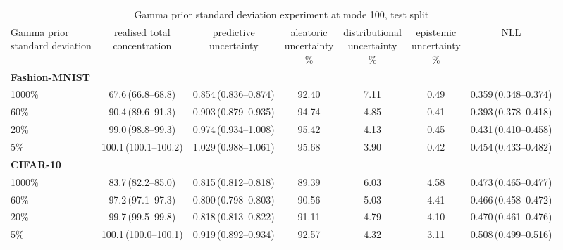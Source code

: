 \begin{tabular}{lcccccc}
\toprule
\multicolumn{7}{c}{Gamma prior standard deviation experiment at mode 100, test split} \\
\shortstack{Gamma prior\\standard deviation} & \shortstack{realised total\\concentration} & \shortstack{predictive\\uncertainty} & \shortstack{aleatoric\\uncertainty\\\%} & \shortstack{distributional\\uncertainty\\\%} & \shortstack{epistemic\\uncertainty\\\%} & NLL \\
\midrule
\multicolumn{7}{l}{\textbf{Fashion-MNIST}} \\
\midrule
1000\% & 67.6\,(66.8--68.8) & 0.854\,(0.836--0.874) & 92.40 & 7.11 & 0.49 & 0.359\,(0.348--0.374) \\
60\% & 90.4\,(89.6--91.3) & 0.903\,(0.879--0.935) & 94.74 & 4.85 & 0.41 & 0.393\,(0.378--0.418) \\
20\% & 99.0\,(98.8--99.3) & 0.974\,(0.934--1.008) & 95.42 & 4.13 & 0.45 & 0.431\,(0.410--0.458) \\
5\% & 100.1\,(100.1--100.2) & 1.029\,(0.988--1.061) & 95.68 & 3.90 & 0.42 & 0.454\,(0.433--0.482) \\
\midrule
\multicolumn{7}{l}{\textbf{CIFAR-10}} \\
\midrule
1000\% & 83.7\,(82.2--85.0) & 0.815\,(0.812--0.818) & 89.39 & 6.03 & 4.58 & 0.473\,(0.465--0.477) \\
60\% & 97.2\,(97.1--97.3) & 0.800\,(0.798--0.803) & 90.56 & 5.03 & 4.41 & 0.466\,(0.458--0.472) \\
20\% & 99.7\,(99.5--99.8) & 0.818\,(0.813--0.822) & 91.11 & 4.79 & 4.10 & 0.470\,(0.461--0.476) \\
5\% & 100.1\,(100.0--100.1) & 0.919\,(0.892--0.934) & 92.57 & 4.32 & 3.11 & 0.508\,(0.499--0.516) \\
\bottomrule
\end{tabular}
